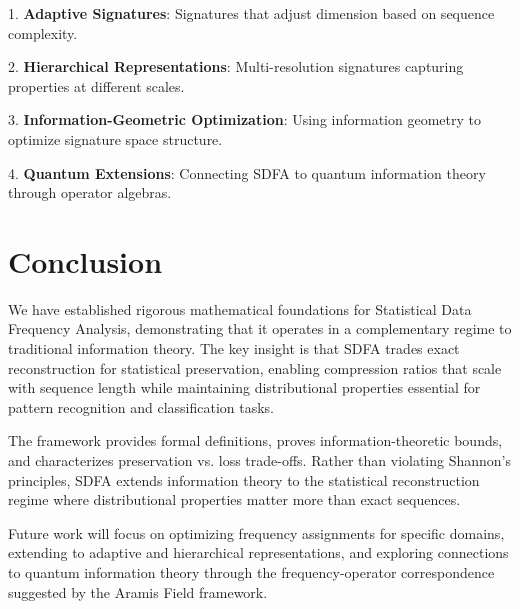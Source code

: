 \documentclass[11pt]{article}
\newcommand{\sdfa}{\textsc{SDFA}}
\begin{document}
1. \textbf{Adaptive Signatures}: Signatures that adjust dimension based on sequence complexity.

2. \textbf{Hierarchical Representations}: Multi-resolution signatures capturing properties at different scales.

3. \textbf{Information-Geometric Optimization}: Using information geometry to optimize signature space structure.

4. \textbf{Quantum Extensions}: Connecting \sdfa{} to quantum information theory through operator algebras.

\section{Conclusion}

We have established rigorous mathematical foundations for Statistical Data Frequency Analysis, demonstrating that it operates in a complementary regime to traditional information theory. The key insight is that \sdfa{} trades exact reconstruction for statistical preservation, enabling compression ratios that scale with sequence length while maintaining distributional properties essential for pattern recognition and classification tasks.

The framework provides formal definitions, proves information-theoretic bounds, and characterizes preservation vs. loss trade-offs. Rather than violating Shannon's principles, \sdfa{} extends information theory to the statistical reconstruction regime where distributional properties matter more than exact sequences.

Future work will focus on optimizing frequency assignments for specific domains, extending to adaptive and hierarchical representations, and exploring connections to quantum information theory through the frequency-operator correspondence suggested by the Aramis Field framework.



\end{document}
